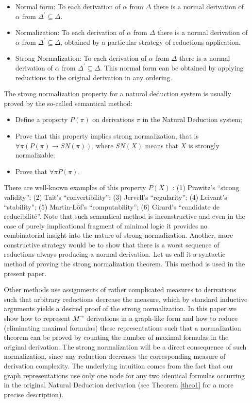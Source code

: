 \documentclass[submission,copyright,creativecommons]{eptcs}
\begin{document}
\begin{itemize}
\item Normal form: To each derivation of $\alpha$ from $\Delta$ there is 
a normal derivation of $\alpha$ from $\Delta^{\prime}\subseteq\Delta$.
\item Normalization: To each derivation of $\alpha$ from $\Delta$ there 
is a normal derivation of $\alpha$ from $\Delta^{\prime}\subseteq\Delta$, 
obtained by a particular strategy of reductions application. 
\item Strong Normalization: To each derivation of $\alpha$ from $\Delta$ 
there is a normal derivation of $\alpha$ from $\Delta^{\prime}\subseteq\Delta$. 
This normal form can be obtained by applying reductions to the original 
derivation in any ordering. 
\end{itemize}

The strong normalization property for a natural deduction system is usually
proved by the so-called semantical method:

\begin{itemize}
\item  Define a property $P(\pi)$ on derivations $\pi$ in the Natural
Deduction system;

\item  Prove that this property implies strong normalization, that is $\forall\pi (P(\pi)\rightarrow SN(\pi))$, where $SN(X)$ means that $X$ is
strongly normalizable;

\item  Prove that $\forall \pi P(\pi)$.
\end{itemize}

There are well-known examples of this property $P(X)$ : (1) Prawitz's
``strong validity''; (2) Tait's ``convertibility''; (3) Jervell's
``regularity''; (4) Leivant's ``stability''; (5) Martin-L\"{o}f's
``computability''; (6) Girard's ``candidate de reducibilit\'{e}''. Note that
such semantical method is inconstructive and even in the case of purely
implicational fragment of minimal logic it provides no combinatorial insight
into the nature of strong normalization. Another, more constructive strategy
would be to show that there is a worst sequence of reductions always
producing a normal derivation. Let us call it a syntactic method of proving
the strong normalization theorem. This method is used in the present paper.

Other methods use assignments of rather complicated measures to derivations
such that arbitrary reductions decrease the measure, which by standard
inductive arguments yields a desired proof of the strong normalization. In
this paper we show how to represent $M^{\rightarrow }$ derivations in a
graph-like form and how to reduce (eliminating maximal formulas) these
representations such that a normalization theorem can be proved by counting
the number of maximal formulas in the original derivation. The strong
normalization will be a direct consequence of such normalization, since any
reduction decreases the corresponding measure of derivation complexity. The
underlying intuition comes from the fact that our graph representations use
only one node for any two identical formulas occurring in the original
Natural Deduction derivation (see Theorem \ref{theo1} for a more precise description).
\end{document}
